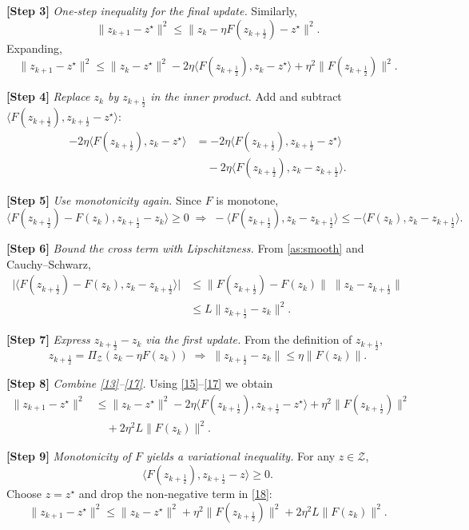 \documentclass{article}
\begin{document}
\noindent\textbf{[Step 3]} \emph{One‑step inequality for the final update.}  
Similarly,
\[
\|z_{k+1}-z^{\star}\|^{2}
\le\|z_{k}-\eta F(z_{k+\frac12})-z^{\star}\|^{2}.
\tag{12}
\]
Expanding,
\[
\|z_{k+1}-z^{\star}\|^{2}
\le\|z_{k}-z^{\star}\|^{2}
   -2\eta\langle F(z_{k+\frac12}),z_{k}-z^{\star}\rangle
   +\eta^{2}\|F(z_{k+\frac12})\|^{2}.
\tag{13}
\]

\noindent\textbf{[Step 4]} \emph{Replace $z_{k}$ by $z_{k+\frac12}$ in the inner product.}  
Add and subtract $\langle F(z_{k+\frac12}),z_{k+\frac12}-z^{\star}\rangle$:
\[
\begin{aligned}
-2\eta\langle F(z_{k+\frac12}),z_{k}-z^{\star}\rangle
&=-2\eta\langle F(z_{k+\frac12}),z_{k+\frac12}-z^{\star}\rangle \\
&\quad-2\eta\langle F(z_{k+\frac12}),z_{k}-z_{k+\frac12}\rangle .
\end{aligned}
\tag{14}
\]

\noindent\textbf{[Step 5]} \emph{Use monotonicity again.}  
Since $F$ is monotone,
\[
\langle F(z_{k+\frac12})-F(z_{k}),z_{k+\frac12}-z_{k}\rangle\ge0
\;\Longrightarrow\;
-\langle F(z_{k+\frac12}),z_{k}-z_{k+\frac12}\rangle
\le -\langle F(z_{k}),z_{k}-z_{k+\frac12}\rangle .
\tag{15}
\]

\noindent\textbf{[Step 6]} \emph{Bound the cross term with Lipschitzness.}  
From \eqref{as:smooth} and Cauchy–Schwarz,
\[
\begin{aligned}
\bigl|\langle F(z_{k+\frac12})-F(z_{k}),z_{k}-z_{k+\frac12}\rangle\bigr|
&\le\|F(z_{k+\frac12})-F(z_{k})\|\;\|z_{k}-z_{k+\frac12}\|\\
&\le L\|z_{k+\frac12}-z_{k}\|^{2}.
\end{aligned}
\tag{16}
\]

\noindent\textbf{[Step 7]} \emph{Express $z_{k+\frac12}-z_{k}$ via the first update.}  
From the definition of $z_{k+\frac12}$,
\[
z_{k+\frac12}= \Pi_{\mathcal{Z}}(z_{k}-\eta F(z_{k}))
\;\Longrightarrow\;
\|z_{k+\frac12}-z_{k}\|\le\eta\|F(z_{k})\|.
\tag{17}
\]

\noindent\textbf{[Step 8]} \emph{Combine \eqref{13}–\eqref{17}.}  
Using \eqref{15}–\eqref{17} we obtain
\[
\begin{aligned}
\|z_{k+1}-z^{\star}\|^{2}
&\le\|z_{k}-z^{\star}\|^{2}
   -2\eta\langle F(z_{k+\frac12}),z_{k+\frac12}-z^{\star}\rangle
   +\eta^{2}\|F(z_{k+\frac12})\|^{2}\\
&\quad+2\eta^{2}L\|F(z_{k})\|^{2}.
\end{aligned}
\tag{18}
\]

\noindent\textbf{[Step 9]} \emph{Monotonicity of $F$ yields a variational inequality.}  
For any $z\in\mathcal{Z}$,
\[
\langle F(z_{k+\frac12}),z_{k+\frac12}-z\rangle\ge0.
\tag{19}
\]
Choose $z=z^{\star}$ and drop the non‑negative term in \eqref{18}:
\[
\|z_{k+1}-z^{\star}\|^{2}
\le\|z_{k}-z^{\star}\|^{2}
   +\eta^{2}\|F(z_{k+\frac12})\|^{2}
   +2\eta^{2}L\|F(z_{k})\|^{2}.
\tag{20}
\]
\end{document}
